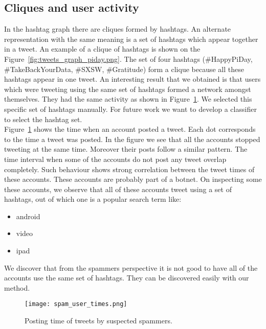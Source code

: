 \documentclass[journal, a4paper, 12pt]{article}
\begin{document}
\subsection{Cliques and user activity}\label{cluques_subsection}
In the hashtag graph there are cliques formed by hashtags. An alternate representation with the same meaning is a set of hashtags which appear together in a tweet. An example of a clique of hashtags is shown on the Figure~\ref{fig:tweets_graph_piday.png}. The set of four hashtags (\#HappyPiDay, \#TakeBackYourData, \#SXSW, \#Gratitude) form a clique because all these hashtags appear in one tweet. An interesting result that we obtained is that users which were tweeting using the same set of hashtags formed a network amongst themselves. They had the same activity as shown in Figure~\ref{fig:spam_user_times}. We selected this specific set of hashtags manually. For future work we want to develop a classifier to select the hashtag set.
\\

Figure~\ref{fig:spam_user_times} shows the time when an account posted a tweet. Each dot corresponds to the time a tweet was posted. In the figure we see that all the accounts stopped tweeting at the same time. Moreover their posts follow a similar pattern. The time interval when some of the accounts do not post any tweet overlap completely. Such behaviour shows strong correlation between the tweet times of these accounts. These accounts are probably part of a botnet. On inspecting some these accounts, we observe that all of these accounts tweet using a set of hashtags, out of which one is a popular search term like:
\begin{itemize}
\item android
\item video
\item ipad
\end{itemize}

We discover that from the spammers perspective it is not good to have all of the accounts use the same set of hashtags. They can be discovered easily with our method. 

\begin{figure}[!hbt]
            \begin{center}
            \texttt{[image: spam\_user\_times.png]}
            \caption{Posting time of tweets by suspected spammers.}
            \label{fig:spam_user_times}
            \end{center}
      \end{figure}
\end{document}
